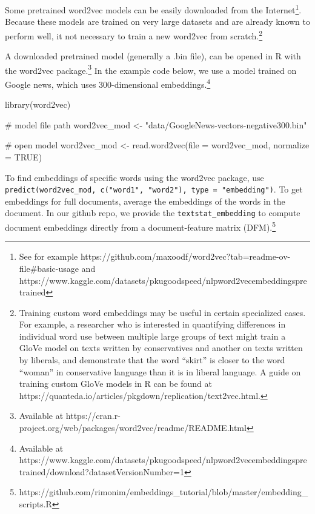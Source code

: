 \documentclass[
  man,
  floatsintext,
  longtable,
  nolmodern,
  notxfonts,
  notimes,
  colorlinks=true,linkcolor=blue,citecolor=blue,urlcolor=blue]{apa7}
\newenvironment{Shaded}{\begin{snugshade}}{\end{snugshade}}
\newcommand{\AttributeTok}[1]{\textcolor[rgb]{0.40,0.45,0.13}{#1}}
\newcommand{\CommentTok}[1]{\textcolor[rgb]{0.37,0.37,0.37}{#1}}
\newcommand{\ConstantTok}[1]{\textcolor[rgb]{0.56,0.35,0.01}{#1}}
\newcommand{\FunctionTok}[1]{\textcolor[rgb]{0.28,0.35,0.67}{#1}}
\newcommand{\NormalTok}[1]{\textcolor[rgb]{0.00,0.23,0.31}{#1}}
\newcommand{\OtherTok}[1]{\textcolor[rgb]{0.00,0.23,0.31}{#1}}
\newcommand{\StringTok}[1]{\textcolor[rgb]{0.13,0.47,0.30}{#1}}
\begin{document}
Some pretrained word2vec models can be easily downloaded from the
Internet\footnote{See for example
  https://github.com/maxoodf/word2vec?tab=readme-ov-file\#basic-usage
  and
  https://www.kaggle.com/datasets/pkugoodspeed/nlpword2vecembeddingspretrained}.
Because these models are trained on very large datasets and are already
known to perform well, it not necessary to train a new word2vec from
scratch.\footnote{Training custom word embeddings may be useful in
  certain specialized cases. For example, a researcher who is interested
  in quantifying differences in individual word use between multiple
  large groups of text might train a GloVe model on texts written by
  conservatives and another on texts written by liberals, and
  demonstrate that the word ``skirt'' is closer to the word ``woman'' in
  conservative language than it is in liberal language. A guide on
  training custom GloVe models in R can be found at
  https://quanteda.io/articles/pkgdown/replication/text2vec.html.}

A downloaded pretrained model (generally a .bin file), can be opened in
R with the word2vec package.\footnote{Available at
  https://cran.r-project.org/web/packages/word2vec/readme/README.html}
In the example code below, we use a model trained on Google news, which
uses 300-dimensional embeddings.\footnote{Available at
  https://www.kaggle.com/datasets/pkugoodspeed/nlpword2vecembeddingspretrained/download?datasetVersionNumber=1}

\begin{Shaded}
\begin{Highlighting}[]
\FunctionTok{library}\NormalTok{(word2vec)}

\CommentTok{\# model file path}
\NormalTok{word2vec\_mod }\OtherTok{\textless{}{-}} \StringTok{"data/GoogleNews{-}vectors{-}negative300.bin"}

\CommentTok{\# open model}
\NormalTok{word2vec\_mod }\OtherTok{\textless{}{-}} \FunctionTok{read.word2vec}\NormalTok{(}\AttributeTok{file =}\NormalTok{ word2vec\_mod, }\AttributeTok{normalize =} \ConstantTok{TRUE}\NormalTok{)}
\end{Highlighting}
\end{Shaded}

To find embeddings of specific words using the word2vec package, use
\texttt{predict(word2vec\_mod,\ c("word1",\ "word2"),\ type\ =\ "embedding")}.
To get embeddings for full documents, average the embeddings of the
words in the document. In our github repo, we provide the
\texttt{textstat\_embedding} to compute document embeddings directly
from a document-feature matrix (DFM).\footnote{https://github.com/rimonim/embeddings\_tutorial/blob/master/embedding\_scripts.R}
\end{document}
